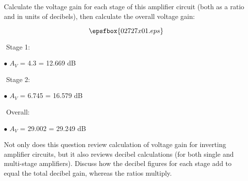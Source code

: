 

Calculate the voltage gain for each stage of this amplifier circuit (both as a ratio and in units of decibels), then calculate the overall voltage gain:

$$\epsfbox{02727x01.eps}$$







\medskip
\goodbreak
\item{$ $} Stage 1:
\item{$\bullet$} $A_V$ = 4.3 = 12.669 dB
\medskip

\medskip
\goodbreak
\item{$ $} Stage 2:
\item{$\bullet$} $A_V$ = 6.745 = 16.579 dB
\medskip

\medskip
\goodbreak
\item{$ $} Overall:
\item{$\bullet$} $A_V$ = 29.002 = 29.249 dB
\medskip







Not only does this question review calculation of voltage gain for inverting amplifier circuits, but it also reviews decibel calculations (for both single and multi-stage amplifiers).  Discuss how the decibel figures for each stage add to equal the total decibel gain, whereas the ratios multiply.




